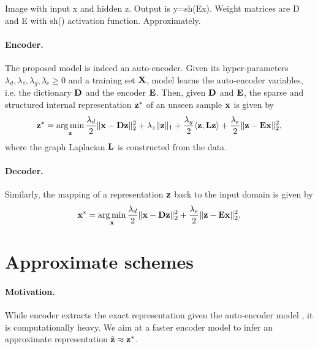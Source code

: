 {\color{red} Image with input x and hidden z. Output is y=sh(Ex). Weight matrices are D and E with sh() activation function. Approximately.}

\paragraph{Encoder.}
The proposed model is indeed an auto-encoder. Given its hyper-parameters $\lambda_d, \lambda_z, \lambda_g, \lambda_e \geq 0$ and a training set $\mathbf{X}$, model  learns the auto-encoder variables, i.e. the dictionary $\mathbf{D}$ and the encoder $\mathbf{E}$. Then, given $\mathbf{D}$ and $\mathbf{E}$, the sparse and structured internal representation $\mathbf{z}^*$ of an unseen sample $\mathbf{x}$ is given by
\begin{equation} \label{eqn:z_exact}
	\mathbf{z}^* = \operatorname*{arg\,min}\limits_{\mathbf{z}} \frac{\lambda_d}{2} \| \mathbf{x} - \mathbf{D} \mathbf{z} \|_2^2 + \lambda_z \| \mathbf{z} \|_1 + \frac{\lambda_g}{2} \langle \mathbf{z} , \mathbf{L} \mathbf{z} \rangle + \frac{\lambda_e}{2} \| \mathbf{z} - \mathbf{E} \mathbf{x} \|_2^2,
\end{equation}
where the graph Laplacian $\mathbf{L}$ is constructed from the data.

\paragraph{Decoder.}
Similarly, the mapping of a representation $\mathbf{z}$ back to the input domain is given by
\begin{equation} \label{eqn:x_exact}
	\mathbf{x}^* = \operatorname*{arg\,min}\limits_{\mathbf{x}} \frac{\lambda_d}{2} \| \mathbf{x} - \mathbf{D} \mathbf{z} \|_2^2 + \frac{\lambda_e}{2} \| \mathbf{z} - \mathbf{E} \mathbf{x} \|_2^2.
\end{equation}

\section{Approximate schemes} \label{sec:approximate_schemes}

\paragraph{Motivation.}
While encoder  extracts the exact representation given the auto-encoder model , it is computationally heavy. We aim at a faster encoder model to infer an approximate representation $\tilde{\mathbf{z}} \approx \mathbf{z}^*$.

